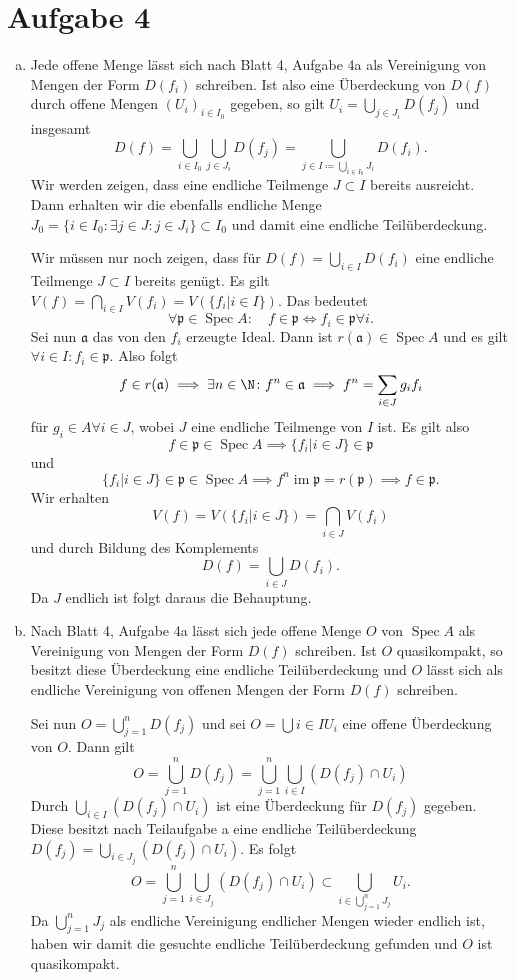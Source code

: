 \documentclass{article}
\newcommand{\im}{\operatorname{im}}
\newcommand{\spec}{\operatorname{Spec}}
\begin{document}
\section*{Aufgabe 4}
\begin{enumerate}[(a)]
    \item Jede offene Menge lässt sich nach Blatt 4, Aufgabe 4a als Vereinigung von Mengen der Form $D(f_i)$ schreiben.
    Ist also eine Überdeckung von $D(f)$ durch offene Mengen $(U_i)_{i\in I_0}$ gegeben, so gilt $U_i = \bigcup_{j \in J_i} D(f_j)$
    und insgesamt 
    $$D(f) = \bigcup_{i \in I_0} \bigcup_{j \in J_i} D(f_j) = \bigcup_{j\in I \coloneqq \bigcup_{i \in I_0} J_i} D(f_i).$$ 
    Wir werden zeigen, dass eine endliche Teilmenge $J \subset I$ bereits ausreicht.
    Dann erhalten wir die ebenfalls endliche Menge $J_0 = \{i \in I_0\colon \exists j \in J\colon j \in J_i\} \subset I_0$
    und damit eine endliche Teilüberdeckung.

    Wir müssen nur noch zeigen, dass für $D(f) = \bigcup_{i\in I} D(f_i)$ eine endliche Teilmenge $J \subset I$ bereits genügt.
    Es gilt $V(f) = \bigcap_{i\in I} V(f_i) = V(\{f_i | i \in I\})$.
    Das bedeutet
    $$\forall \mathfrak{p} \in \spec A\colon \quad f \in \mathfrak{p} \Leftrightarrow f_i \in \mathfrak{p} \forall i.$$
    Sei nun $\mathfrak{a}$ das von den $f_i$ erzeugte Ideal. Dann ist $r(\mathfrak{a}) \in \spec A$ und es gilt 
    $\forall i \in I\colon f_i \in \mathfrak{p}$.
    Also folgt 
    $$f \in r(\mathfrak{a}) \implies \exists n \in \N \colon f^n \in \mathfrak{a} \implies f^n = \sum_{i \in J} g_if_i$$
    für $g_i \in A \forall i\in J$, wobei $J$ eine endliche Teilmenge von $I$ ist. 
    Es gilt also $$f \in \mathfrak{p}\in \spec A \implies \{f_i| i\in J\} \in \mathfrak{p}$$ und 
    $$\{f_i| i \in J\} \in \mathfrak{p} \in \spec A \implies f^n \im \mathfrak{p} = r(\mathfrak{p}) \implies f \in \mathfrak{p}.$$
    Wir erhalten
    $$V(f) = V(\{f_i | i \in J\}) = \bigcap_{i\in J} V(f_i)$$
    und durch Bildung des Komplements
    $$D(f) = \bigcup_{i\in J} D(f_i).$$
    Da $J$ endlich ist folgt daraus die Behauptung.
    \item Nach Blatt 4, Aufgabe 4a lässt sich jede offene Menge $O$ von $\spec A$ als Vereinigung von 
    Mengen der Form $D(f)$ schreiben. Ist $O$ quasikompakt, so besitzt diese Überdeckung eine endliche Teilüberdeckung
    und $O$ lässt sich als endliche Vereinigung von offenen Mengen der Form $D(f)$ schreiben.
    
    Sei nun $O = \bigcup_{j = 1}^n D(f_j)$ und sei $O = \bigcup{i \in I} U_i$ eine offene Überdeckung von $O$.
    Dann gilt 
    $$O = \bigcup_{j = 1}^n D(f_j) = \bigcup_{j = 1}^n \bigcup_{i \in I} (D(f_j) \cap U_i)$$
    Durch $\bigcup_{i \in I} (D(f_j) \cap U_i)$ ist eine Überdeckung für $D(f_j)$ gegeben.
    Diese besitzt nach Teilaufgabe a eine endliche Teilüberdeckung $D(f_j) = \bigcup_{i \in J_j} (D(f_j) \cap U_i)$.
    Es folgt
    $$O = \bigcup_{j = 1}^n \bigcup_{i \in J_j} (D(f_j) \cap U_i) \subset \bigcup_{i \in \bigcup_{j=1}^n J_j} U_i.$$
    Da $\bigcup_{j=1}^n J_j$ als endliche Vereinigung endlicher Mengen wieder endlich ist, haben wir damit die gesuchte
    endliche Teilüberdeckung gefunden und $O$ ist quasikompakt.
\end{enumerate}
\end{document}
